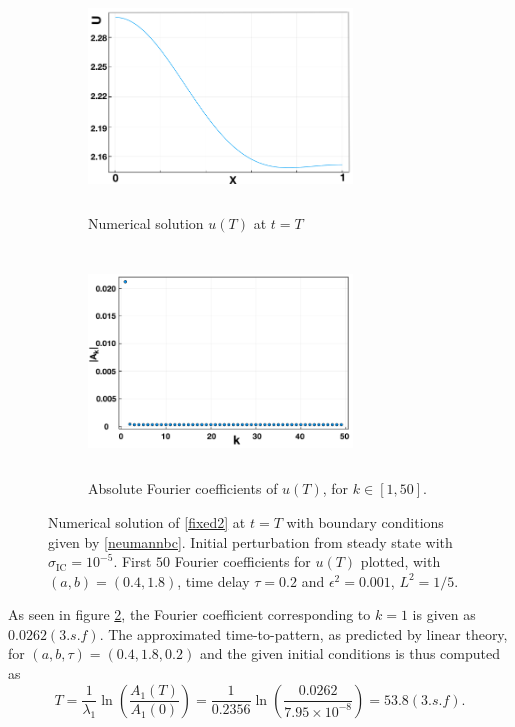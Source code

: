 \begin{figure}[H]
    \centering
    \begin{subfigure}[t]{0.45\textwidth}
        \centering
        \includegraphics[width=7cm,height=6cm]{Tu.png}
        \caption{Numerical solution $u(T)$ at $t=T$}
        \label{uT}
    \end{subfigure}
    \hfill
    \begin{subfigure}[t]{0.45\textwidth}
        \centering
        \includegraphics[width=7cm,height=6cm]{FCs.png}
        \caption{Absolute Fourier coefficients of $u(T)$, for $k\in[1,50]$.}
        \label{fig:uTfc}
    \end{subfigure}
    \caption{Numerical solution of \eqref{fixed2} at $t=T$ with boundary conditions given by \eqref{neumannbc}. Initial perturbation from steady state with $\sigma_{\text{IC}}=10^{-5}$. First $50$ Fourier coefficients for $u(T)$ plotted, with $(a,b)=(0.4,1.8)$, time delay $\tau=0.2$ and $\epsilon^2=0.001$, $L^2=1/5$.}
    \label{fig:Tfc}
\end{figure}
As seen in figure \ref{fig:uTfc}, the Fourier coefficient corresponding to $k=1$ is given as $0.0262(3.s.f)$. The approximated time-to-pattern, as predicted by linear theory, for $(a,b,\tau)=(0.4,1.8,0.2)$ and the given initial conditions is thus computed as
\begin{equation}
    T=\frac{1}{\lambda_1}\ln\left(\frac{A_1(T)}{A_1(0)}\right)=\frac{1}{0.2356}\ln\left(\frac{0.0262}{7.95\times10^{-8}}\right)=53.8(3.s.f).
\end{equation}
